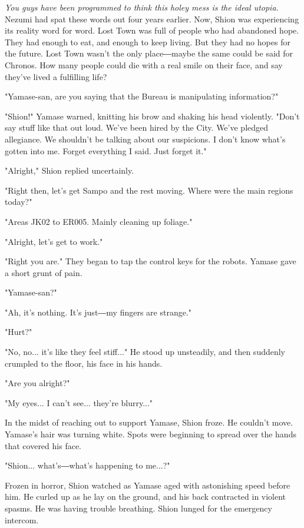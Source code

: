 \emph{You guys have been programmed to think this holey mess is the ideal
	utopia.} Nezumi had spat these words out four years earlier. Now, Shion
was experiencing its reality word for word. Lost Town was full of people
who had abandoned hope. They had enough to eat, and enough to keep
living. But they had no hopes for the future. Lost Town wasn't the only
place―maybe the same could be said for Chronos. How many people could
die with a real smile on their face, and say they've lived a fulfilling
life?

"Yamase-san, are you saying that the Bureau is manipulating
information?"

"Shion!" Yamase warned, knitting his brow and shaking his head
violently. "Don't say stuff like that out loud. We've been hired by the
City. We've pledged allegiance. We shouldn't be talking about our
suspicions. I don't know what's gotten into me. Forget everything I
said. Just forget it."

"Alright," Shion replied uncertainly.

"Right then, let's get Sampo and the rest moving. Where were the main
regions today?"

"Areas JK02 to ER005. Mainly cleaning up foliage."

"Alright, let's get to work."

"Right you are." They began to tap the control keys for the robots.
Yamase gave a short grunt of pain.

"Yamase-san?"

"Ah, it's nothing. It's just―my fingers are strange."

"Hurt?"

"No, no... it's like they feel stiff..." He stood up unsteadily, and
then suddenly crumpled to the floor, his face in his hands.

"Are you alright?"

"My eyes... I can't see... they're blurry..."

In the midst of reaching out to support Yamase, Shion froze. He couldn't
move. Yamase's hair was turning white. Spots were beginning to spread
over the hands that covered his face.

"Shion... what's―what's happening to me...?"

Frozen in horror, Shion watched as Yamase aged with astonishing speed
before him. He curled up as he lay on the ground, and his back
contracted in violent spasms. He was having trouble breathing. Shion
lunged for the emergency intercom.

